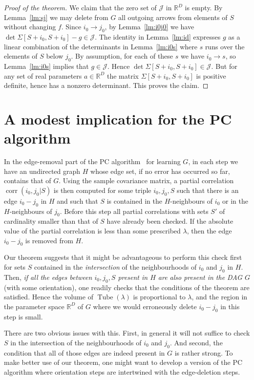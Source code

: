 \documentclass[ALCO,ThmDefs,Unicode]{cedram}
\DeclareMathOperator{\Tube}{Tube}
\DeclareMathOperator{\corr}{corr}
\newcommand{\RR}{\mathbb{R}}
\newcommand{\cJ}{\mathcal{J}}
\begin{document}
\begin{proof}[Proof of the theorem]
We claim that the zero set of $\cJ$ in $\RR^D$ is empty. By Lemma~\ref{lm:sj} we may delete from $G$ all outgoing arrows from elements of $S$ without changing $f$. Since $i_0 \to j_0$, by Lemma~\ref{lm:i0j0} we have $\det \Sigma[S+i_0,S+i_0]-g \in \cJ$. The identity in Lemma~\ref{lm:id} expresses $g$ as a linear combination of the determinants in Lemma~\ref{lm:i0s} where $s$ runs over the elements of $S$ below $j_0$. By assumption, for each of these $s$ we have $i_0 \to s$, so Lemma~\ref{lm:i0s} implies that $g \in \cJ$. Hence $\det \Sigma[S+i_0,S+i_0]
\in \cJ$. But for any set of real parameters $a \in \RR^D$ the matrix $\Sigma[S+i_0,S+i_0]$ is positive definite, hence has a nonzero determinant. This proves the claim.
\end{proof}

\section{A modest implication for the PC algorithm} \label{sec:Open}

In the edge-removal part of the PC algorithm~\cite{Spirtes01} for learning $G$, in each step we have an undirected graph $H$ whose edge set, if no error has occurred so far, contains that of $G$. Using the sample covariance matrix, a partial correlation $\corr(i_0,j_0|S)$ is then computed for some triple $i_0,j_0,S$ such that there is an edge $i_0-j_0$ in $H$ and such that $S$ is contained in the $H$-neighbours of $i_0$ or in the $H$-neighbours of $j_0$. Before this step all partial correlations with sets $S'$ of cardinality smaller than that of $S$ have already been checked. If the absolute value of the partial correlation is less than some prescribed $\lambda$, then the edge $i_0-j_0$ is removed from $H$.

Our theorem suggests that it might be advantageous to perform this check first for sets $S$ contained in the \emph{intersection} of the neighbourhoods of $i_0$ and $j_0$ in $H$. Then, \emph{if all the edges between $i_0,j_0,S$ present in $H$ are also present in the DAG $G$} (with some orientation), one readily checks that the conditions of the theorem are satisfied. Hence the volume of $\Tube(\lambda)$ is proportional to $\lambda$, and the region in the parameter space $\RR^D$ of $G$ where we would erroneously delete $i_0-j_0$ in this step is small.

There are two obvious issues with this. First, in general it will not suffice to check $S$ in the intersection of the neighbourhoods of $i_0$ and $j_0$. And second, the condition that all of those edges are indeed present in $G$ is rather strong. To make better use of our theorem, one might want to develop a version of the PC algorithm where orientation steps are intertwined with the edge-deletion steps.
\end{document}
